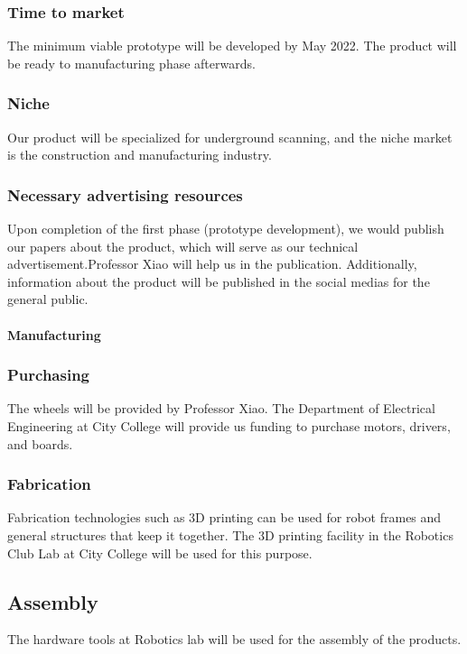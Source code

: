 \subsubsection{Time to market} The minimum viable prototype will be developed by May 2022. The product will be ready to manufacturing phase afterwards. 

\subsubsection{Niche} Our product will be specialized for underground scanning, and the niche market is the construction and manufacturing industry.

\subsubsection{Necessary advertising resources}Upon completion of the first phase (prototype development), we would publish our papers about the product, which will serve as our technical advertisement.Professor Xiao will help us in the publication.  Additionally, information about the product will be published in the social medias for the general public.\\\\

\textbf{Manufacturing}
\subsubsection{Purchasing} The wheels will be provided by Professor Xiao. The Department of Electrical Engineering at City College will provide us funding to purchase motors, drivers, and boards.

\subsubsection{Fabrication} Fabrication technologies such as 3D printing can be used for robot frames and general structures that keep it together. The 3D printing facility in the Robotics Club Lab at City College will be used for this purpose.

\subsection{Assembly} The hardware tools at Robotics lab will be used for the assembly of the products.
